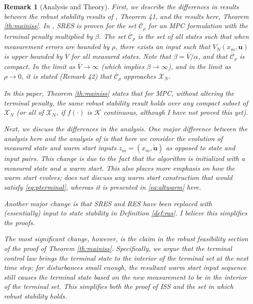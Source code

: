 \documentclass{article}
\newtheorem{remark}{Remark}
\begin{document}
\begin{remark}[Analysis and Theory]
\label{rm:analysis}
First, we describe the differences in results between the robust stability results of \cite{pannocchia:rawlings:wright:2011}, Theorem 41, and the results here, Theorem \ref{th:mainiss}. In \cite{pannocchia:rawlings:wright:2011}, SRES is proven for the set $\overline{\mathcal{C}}_\rho$ for an MPC formulation with the
terminal penalty multiplied by $\beta$. The set $\overline{\mathcal{C}}_\rho$ is the set of all states such
that when measurement errors are bounded by $\rho$, there exists an input such that $V_N(x_m,\mathbf{u})$ 
is upper bounded by $\overline{V}$ for all measured states. Note that $\beta = \overline{V}/\alpha$, and
that $\overline{\mathcal{C}}_\rho$ is compact. In
the limit as $\overline{V} \rightarrow \infty$ (which implies $\beta \rightarrow \infty$), and in the limit as $\rho \rightarrow 0$, it is stated (Remark 42) that $\overline{\mathcal{C}}_\rho$ approaches 
$\mathcal{X}_N$.

In this paper, Theorem \ref{th:mainiss} states that for MPC, without altering the terminal penalty, the
same robust stability result holds over any compact subset of $\mathcal{X}_N$ (or all of $\mathcal{X}_N$,
if $f(\cdot)$ is $\mathcal{K}$ continuous, although I have not proved this yet).

Next, we discuss the differences in the analysis.
One major difference between the analysis here and the analysis of \cite{pannocchia:rawlings:wright:2011}
is that here we consider the evolution of measured state and warm start inputs $z_m = (x_m,\tilde{\mathbf{u}})$ as
opposed to state and input pairs. This change is due to the fact that the algorithm is initialized with
a measured state and a warm start. This also places more emphasis on how the warm start evolves;
\cite{pannocchia:rawlings:wright:2011} does not discuss any warm start construction that would 
satisfy \eqref{eq:pterminal}, whereas it is presented in \eqref{eq:altwarm} here.

Another major change is that SRES and RES have been replaced with (essentially) input to state stability
in Definition \ref{def:ras}. I believe this simplifies the proofs.

The most significant change, however, is the claim in the robust feasibility section of the proof of 
Theorem \ref{th:mainiss}. Specifically, we argue that the terminal control law brings the terminal state
to the interior of the terminal set at the next time step; for disturbances small enough, the resultant
warm start input sequence still causes the terminal state based on the new measurement to be 
in the interior of the terminal set. This simplifies both the proof of ISS and the set in which 
robust stability holds. 
\end{remark}
\end{document}
